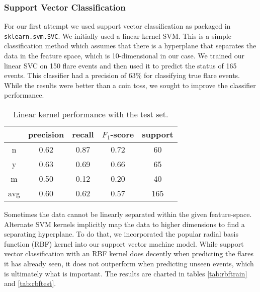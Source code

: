 \documentclass[11pt]{article}
\begin{document}
\subsubsection{Support Vector Classification}
\label{sec:svc}
For our first attempt we used support vector classification as
packaged in \verb|sklearn.svm.SVC|. We initially used a linear kernel
SVM. This is a simple classification method which assumes that there
is a hyperplane that separates the data in the feature space, which is
10-dimensional in our case.  We trained our linear SVC on 150 flare
events and then used it to predict the status of 165 events.  This
classifier had a precision of 63\% for classifying true flare events.
While the results were better than a coin toss, we sought to improve
the classifier performance.
\begin{table}
  \centering
  \begin{tabular}[!htbp]{c|c c c c}
        & precision &recall &$F_1$-score &support \\ \hline
    n   & 0.62      &0.87   &0.72     &60      \\
    y   & 0.63      &0.69   &0.66     &65      \\
    m   & 0.50      &0.12   &0.20     &40      \\ \hline
    avg & 0.60      &0.62   &0.57     &165     \\
  \end{tabular}
  \caption{Linear kernel performance with the test set.}
  \label{tab:lintest}
\end{table}

Sometimes the data cannot be linearly separated within the given
feature-space.  Alternate SVM kernels implicitly map the data to
higher dimensions to find a separating hyperplane.  To do that, we
incorporated the popular radial basis function (RBF) kernel into our
support vector machine model.  While support vector classification
with an RBF kernel does decently when predicting the flares it has
already seen, it does not outperform when predicting unseen events,
which is ultimately what is important. The results are charted in
tables \ref{tab:rbftrain} and \ref{tab:rbftest}.
\end{document}
